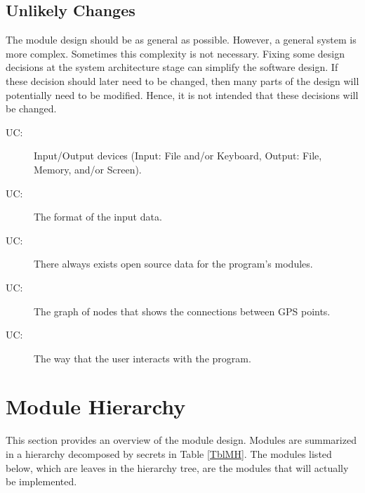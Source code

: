 \documentclass[12pt, titlepage]{article}
\newcounter{ucnum}
\newcommand{\uctheucnum}{UC\theucnum}
\begin{document}
\subsection{Unlikely Changes} \label{SecUchange}

The module design should be as general as possible. However, a general system is
more complex. Sometimes this complexity is not necessary. Fixing some design
decisions at the system architecture stage can simplify the software design. If
these decision should later need to be changed, then many parts of the design
will potentially need to be modified. Hence, it is not intended that these
decisions will be changed.

\begin{description}
\item[ \uctheucnum \label{ucIO}:] Input/Output devices
  (Input: File and/or Keyboard, Output: File, Memory, and/or Screen).
\item[ \uctheucnum \label{ucInput}:] The format of the
  input data.
\item[ \uctheucnum \label{ucSource}:] There always exists
  open source data for the program's modules.
\item[ \uctheucnum \label{ucNodes}:] The graph of nodes
  that shows the connections between GPS points.
\item[ \uctheucnum \label{ucInteraction}:] The way that 
  the user interacts with the program.
\end{description}

\section{Module Hierarchy} \label{SecMH}

This section provides an overview of the module design. Modules are summarized
in a hierarchy decomposed by secrets in Table \ref{TblMH}. The modules listed
below, which are leaves in the hierarchy tree, are the modules that will
actually be implemented.
\end{document}
